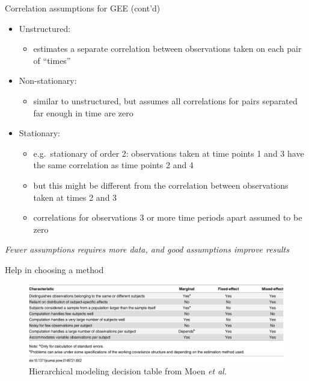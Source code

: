 \documentclass[
  ignorenonframetext,
]{beamer}
\providecommand{\tightlist}{%
  \setlength{\itemsep}{0pt}\setlength{\parskip}{0pt}}
\begin{document}
\begin{frame}{Correlation assumptions for GEE (cont'd)}
\protect\hypertarget{correlation-assumptions-for-gee-contd}{}

\begin{itemize}
\tightlist
\item
  Unstructured:

  \begin{itemize}
  \tightlist
  \item
    estimates a separate correlation between observations taken on each
    pair of ``times''
  \end{itemize}
\item
  Non-stationary:

  \begin{itemize}
  \tightlist
  \item
    similar to unstructured, but assumes all correlations for pairs
    separated far enough in time are zero
  \end{itemize}
\item
  Stationary:

  \begin{itemize}
  \tightlist
  \item
    e.g.~stationary of order 2: observations taken at time points 1 and
    3 have the same correlation as time points 2 and 4
  \item
    but this might be different from the correlation between
    observations taken at times 2 and 3
  \item
    correlations for observations 3 or more time periods apart assumed
    to be zero
  \end{itemize}
\end{itemize}

\emph{Fewer assumptions requires more data, and good assumptions improve
results}

\end{frame}

\begin{frame}{Help in choosing a method}
\protect\hypertarget{help-in-choosing-a-method}{}

\begin{figure}
\centering
\includegraphics{journal.pone.0146721.t002.PNG}
\caption{Hierarchical modeling decision table from Moen \emph{et al.}}
\end{figure}

\end{frame}
\end{document}
